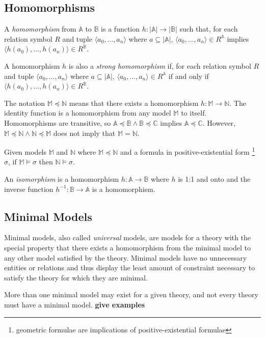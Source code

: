 	\subsection{Homomorphisms}

		A \emph{homomorphism} from $\mathbb{A}$ to $\mathbb{B}$ is a function
		$h: |\mathbb{A}|\to|\mathbb{B}|$ such that, for each relation symbol
		$R$ and tuple $\langle a_0 , \ldots , a_n \rangle$ where $a \subseteq
		|\mathbb{A}|$, $\langle a_0 , \ldots , a_n  \rangle \in R^\mathbb{A}$
		implies $\langle h(a_0) , \ldots , h(a_n) \rangle \in R^\mathbb{B}$.

		A homomorphism $h$ is also a \emph{strong homomorphism} if, for each
		relation symbol $R$ and tuple $\langle a_0 , \ldots , a_n \rangle$
		where $a \subseteq |\mathbb{A}|$, $\langle a_0 , \ldots , a_n  \rangle
		\in R^\mathbb{A}$ if and only if $\langle h(a_0) , \ldots , h(a_n)
		\rangle \in R^\mathbb{B}$.

		The notation $\mathbb{M} \preceq \mathbb{N}$ means that there exists a
		homomorphism $h : \mathbb{M} \to \mathbb{N}$. The identity function is
		a homomorphism from any model $\mathbb{M}$ to itself.  Homomorphisms
		are transitive, so $\mathbb{A} \preceq \mathbb{B} \wedge \mathbb{B}
		\preceq \mathbb{C}$ implies $\mathbb{A} \preceq \mathbb{C}$. However,
		$\mathbb{M} \preceq \mathbb{N} \wedge \mathbb{N} \preceq \mathbb{M}$
		does not imply that $\mathbb{M} = \mathbb{N}$.

		Given models $\mathbb{M}$ and $\mathbb{N}$ where $\mathbb{M} \preceq
		\mathbb{N}$ and a formula in positive-existential form
		\footnote{geometric formulae are implications of positive-existential
		formulae} $\sigma$, if $\mathbb{M} \models \sigma$ then $\mathbb{N}
		\models \sigma$.

		An \emph{isomorphism} is a homomorphism $h : \mathbb{A} \to \mathbb{B}$
		where $h$ is 1:1 and onto and the inverse function $h^{-1} : \mathbb{B}
		\to \mathbb{A}$ is a homomorphism.

	\subsection{Minimal Models}

		Minimal models, also called \emph{universal} models, are models for a
		theory with the special property that there exists a homomorphism from
		the minimal model to any other model satisfied by the theory. Minimal
		models have no unnecessary entities or relations and thus display the
		least amount of constraint necessary to satisfy the theory for which
		they are minimal.

		More than one minimal model may exist for a given theory, and not every
		theory must have a minimal model. \textbf{give examples}
